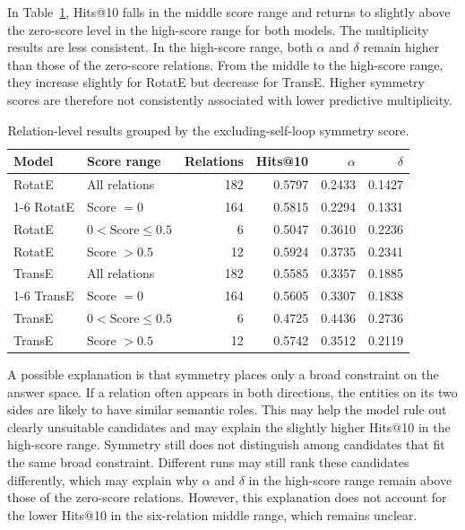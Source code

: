 In Table~\ref{tab:symmetry-score-groups}, Hits@10 falls in the middle score
range and returns to slightly above the zero-score level in the high-score
range for both models. The multiplicity results are less consistent. In the
high-score range, both \(\alpha\) and \(\delta\) remain higher than those of the
zero-score relations. From the middle to the high-score range, they increase
slightly for RotatE but decrease for TransE. Higher symmetry scores are
therefore not consistently associated with lower predictive multiplicity.

\begin{table}[!t]
    \centering
    \caption{Relation-level results grouped by the excluding-self-loop
    symmetry score.}
    \label{tab:symmetry-score-groups}
    \small
    \begin{tabular}{llrrrr}
        \toprule
        Model & Score range & Relations & Hits@10 & \(\alpha\) & \(\delta\) \\
        \midrule
        RotatE & All relations & 182 & 0.5797 & 0.2433 & 0.1427 \\
        \cmidrule(lr){1-6}
        RotatE & Score \(=0\) & 164 & 0.5815 & 0.2294 & 0.1331 \\
        RotatE & \(0<\text{Score}\leq 0.5\) & 6 & 0.5047 & 0.3610 & 0.2236 \\
        RotatE & Score \(>0.5\) & 12 & 0.5924 & 0.3735 & 0.2341 \\
        \midrule
        TransE & All relations & 182 & 0.5585 & 0.3357 & 0.1885 \\
        \cmidrule(lr){1-6}
        TransE & Score \(=0\) & 164 & 0.5605 & 0.3307 & 0.1838 \\
        TransE & \(0<\text{Score}\leq 0.5\) & 6 & 0.4725 & 0.4436 & 0.2736 \\
        TransE & Score \(>0.5\) & 12 & 0.5742 & 0.3512 & 0.2119 \\
        \bottomrule
    \end{tabular}
\end{table}

A possible explanation is that symmetry places only a broad constraint on the
answer space. If a relation often appears in both directions, the entities on
its two sides are likely to have similar semantic roles. This may help the
model rule out clearly unsuitable candidates and may explain the slightly
higher Hits@10 in the high-score range. Symmetry still does not distinguish
among candidates that fit the same broad constraint. Different runs may still
rank these candidates differently, which may explain why \(\alpha\) and
\(\delta\) in the high-score range remain above those of the zero-score
relations. However, this explanation does not account for the lower Hits@10 in
the six-relation middle range, which remains unclear.
